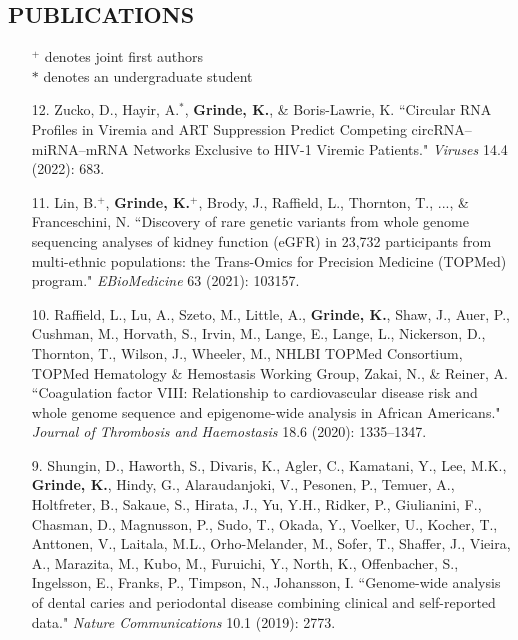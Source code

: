 \documentclass[margin]{res}
\begin{document}
\begin{resume}
										
\section{PUBLICATIONS} 

\begin{itemize}

\item[] $^{+}$ denotes joint first authors \\$*$ denotes an undergraduate student \\

\item[12.] Zucko, D., Hayir, A.$^*$,  \textbf{Grinde, K.}, \& Boris-Lawrie, K. ``Circular RNA Profiles in Viremia and ART Suppression Predict Competing circRNA–miRNA–mRNA Networks Exclusive to HIV-1 Viremic Patients." \textit{Viruses} 14.4 (2022): 683.

\item[11.] Lin, B.$^{+}$, \textbf{Grinde, K.}$^{+}$, Brody, J., Raffield, L., Thornton, T., ..., \& Franceschini, N. ``Discovery of rare genetic variants from whole genome sequencing analyses  of kidney function (eGFR) in 23,732 participants from multi-ethnic populations: the Trans-Omics for Precision Medicine (TOPMed) program." \textit{EBioMedicine} 63 (2021): 103157.

\item[10.] Raffield, L., Lu, A., Szeto, M., Little, A., \textbf{Grinde, K.},  Shaw, J., Auer, P., Cushman, M., Horvath, S., Irvin, M., Lange, E., Lange, L., Nickerson, D., Thornton, T., Wilson, J., Wheeler, M., NHLBI TOPMed Consortium, TOPMed Hematology \& Hemostasis Working Group, Zakai, N., \& Reiner, A. ``Coagulation factor VIII: Relationship to cardiovascular disease risk and whole genome sequence and epigenome-wide analysis in African Americans." \textit{Journal of Thrombosis and Haemostasis} 18.6 (2020): 1335--1347.

\item[9.] Shungin, D., Haworth, S., Divaris, K., Agler, C., Kamatani, Y., Lee, M.K., \textbf{Grinde, K.}, Hindy, G., Alaraudanjoki, V., Pesonen, P., Temuer, A., Holtfreter, B., Sakaue, S., Hirata, J., Yu, Y.H., Ridker, P., Giulianini, F., Chasman, D., Magnusson, P., Sudo, T., Okada, Y., Voelker, U., Kocher, T., Anttonen, V., Laitala, M.L., Orho-Melander, M., Sofer, T., Shaffer, J., Vieira, A., Marazita, M., Kubo, M., Furuichi, Y., North, K., Offenbacher, S., Ingelsson, E., Franks, P., Timpson, N., Johansson, I. ``Genome-wide analysis of dental caries and periodontal disease combining clinical and self-reported data." \textit{Nature Communications} 10.1 (2019): 2773.


\end{itemize}
\end{resume}
\end{document}
